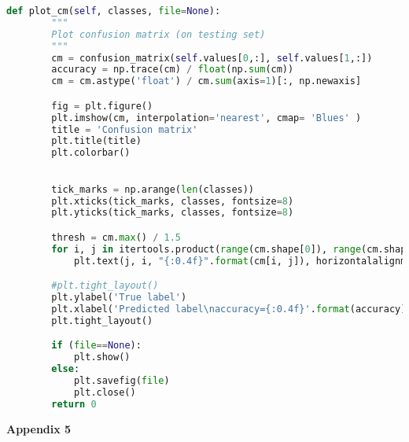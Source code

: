\begin{lstlisting}[language=Python, breaklines]
    def plot_cm(self, classes, file=None):
        """
        Plot confusion matrix (on testing set)
        """
        cm = confusion_matrix(self.values[0,:], self.values[1,:])
        accuracy = np.trace(cm) / float(np.sum(cm))
        cm = cm.astype('float') / cm.sum(axis=1)[:, np.newaxis]

        fig = plt.figure()
        plt.imshow(cm, interpolation='nearest', cmap= 'Blues' )
        title = 'Confusion matrix'
        plt.title(title)
        plt.colorbar()
        

        tick_marks = np.arange(len(classes))
        plt.xticks(tick_marks, classes, fontsize=8)
        plt.yticks(tick_marks, classes, fontsize=8)

        thresh = cm.max() / 1.5
        for i, j in itertools.product(range(cm.shape[0]), range(cm.shape[1])):
            plt.text(j, i, "{:0.4f}".format(cm[i, j]), horizontalalignment="center", color="white" if cm[i, j] > thresh else "black")

        #plt.tight_layout()
        plt.ylabel('True label')
        plt.xlabel('Predicted label\naccuracy={:0.4f}'.format(accuracy))
        plt.tight_layout()

        if (file==None):
            plt.show()
        else:
            plt.savefig(file)
            plt.close()
        return 0
\end{lstlisting}


\cleardoublepage\clearpage
\large \vspace{1cm}
{\bf Appendix 5} 
\small 

